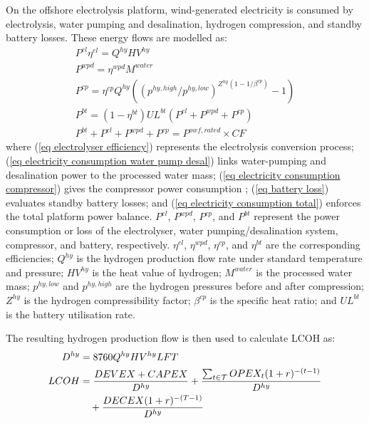 \documentclass[sn-mathphys,Numbered]{sn-jnl}%
\theoremstyle{plain}%
\theoremstyle{definition}%
\theoremstyle{remark}%
\begin{document}
On the offshore electrolysis platform, wind-generated electricity is consumed by electrolysis, water pumping and desalination, hydrogen compression, and standby battery losses. These energy flows are modelled as:
\begin{gather}
    P^{el} \eta^{el} = Q^{hy} HV^{hy}
\label{eq electrolyser efficiency} \\
    P^{wpd} = \eta^{wpd} M^{water}
\label{eq electricity consumption water pump desal}    \\
    P^{cp} = \eta^{cp} Q^{hy} \left( (p^{hy,high}/p^{hy,low})^{Z^{hy}(1-1/\beta^{cp})}-1 \right)
\label{eq electricity consumption compressor}    \\
    P^{bt} = (1-\eta^{bt}) UL^{bt} (P^{el} + P^{wpd} + P^{cp})
\label{eq battery loss}    \\
    P^{bt} + P^{el} + P^{wpd} + P^{cp} = P^{owf,rated} \times CF
\label{eq electricity consumption total}
\end{gather}
where (\ref{eq electrolyser efficiency}) represents the electrolysis conversion process; (\ref{eq electricity consumption water pump desal}) links water-pumping and desalination power to the processed water mass; (\ref{eq electricity consumption compressor}) gives the compressor power consumption \cite{bao2019multi}; (\ref{eq battery loss}) evaluates standby battery losses; and (\ref{eq electricity consumption total}) enforces the total platform power balance. $P^{el}$, $P^{wpd}$, $P^{cp}$, and $P^{bt}$ represent the power consumption or loss of the electrolyser, water pumping/desalination system, compressor, and battery, respectively. $\eta^{el}$, $\eta^{wpd}$, $\eta^{cp}$, and $\eta^{bt}$ are the corresponding efficiencies; $Q^{hy}$ is the hydrogen production flow rate under standard temperature and pressure; $HV^{hy}$ is the heat value of hydrogen; $M^{water}$ is the processed water mass; $p^{hy,low}$ and $p^{hy,high}$ are the hydrogen pressures before and after compression; $Z^{hy}$ is the hydrogen compressibility factor; $\beta^{cp}$ is the specific heat ratio; and $UL^{bt}$ is the battery utilisation rate.

The resulting hydrogen production flow is then used to calculate LCOH as:
\begin{align}
    D^{hy} &= 8760 Q^{hy} HV^{hy} LF T \notag\\
    LCOH &=
    \frac{DEVEX + CAPEX}{D^{hy}}
    + \frac{\sum_{t \in \mathcal{T}} OPEX_t (1+r)^{-(t-1)}}{D^{hy}}
    \notag\\
    &\quad
    + \frac{DECEX(1+r)^{-(T-1)}}{D^{hy}}
\end{align}
\end{document}
